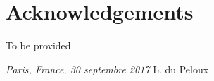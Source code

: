\chapter*{Acknowledgements}
To be provided

\bigskip
 
\noindent\textit{Paris, France, 30 septembre 2017}
\hfill L. du Peloux
